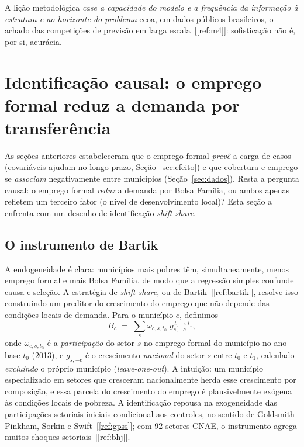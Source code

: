 \documentclass[12pt,a4paper,oneside]{article}
\newcommand{\C}[1]{[\ref{#1}]}
\begin{document}
A lição metodológica \textemdash{} \emph{case a capacidade do modelo e a
frequência da informação à estrutura e ao horizonte do problema}
\textemdash{} ecoa, em dados públicos brasileiros, o achado das competições
de previsão em larga escala~\C{ref:m4}: sofisticação não é, por si,
acurácia.

\section{Identificação causal: o emprego formal reduz a demanda por transferência}
\label{sec:causal}

As seções anteriores estabeleceram que o emprego formal \emph{prevê} a
carga de casos (covariáveis ajudam no longo prazo, Seção~\ref{sec:efeito})
e que cobertura e emprego se \emph{associam} negativamente entre municípios
(Seção~\ref{sec:dados}). Resta a pergunta causal: o emprego formal
\emph{reduz} a demanda por Bolsa Família, ou ambos apenas refletem um
terceiro fator (o nível de desenvolvimento local)? Esta seção a enfrenta com
um desenho de identificação \emph{shift-share}.

\subsection{O instrumento de Bartik}

A endogeneidade é clara: municípios mais pobres têm, simultaneamente, menos
emprego formal e mais Bolsa Família, de modo que a regressão simples confunde
causa e seleção. A estratégia de \emph{shift-share}, ou de
Bartik~\C{ref:bartik}, resolve isso construindo um preditor do crescimento
do emprego que não depende das condições locais de demanda. Para o município
$c$, definimos
\begin{equation}
B_c \;=\; \sum_{s} \omega_{c,s,t_0}\;g_{s,-c}^{\,t_0\to t_1},
\label{eq:bartik}
\end{equation}
onde $\omega_{c,s,t_0}$ é a \emph{participação} do setor $s$ no emprego
formal do município no ano-base $t_0$ (2013), e $g_{s,-c}$ é o crescimento
\emph{nacional} do setor $s$ entre $t_0$ e $t_1$, calculado \emph{excluindo}
o próprio município (\emph{leave-one-out}). A intuição: um município
especializado em setores que cresceram nacionalmente herda esse crescimento
por composição, e essa parcela do crescimento do emprego é plausivelmente
exógena às condições locais de pobreza. A identificação repousa na
exogeneidade das participações setoriais iniciais condicional aos controles,
no sentido de Goldsmith-Pinkham, Sorkin e Swift~\C{ref:gpss}; com 92 setores
CNAE, o instrumento agrega muitos choques setoriais~\C{ref:bhj}.
\end{document}
